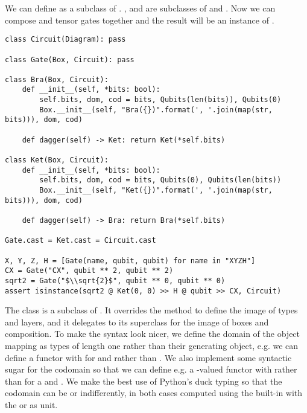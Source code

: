 \begin{example}\label{example:circuit-diagrams}
We can define  as a subclass of . ,  and  are subclasses of  and .
Now we can compose and tensor gates together and the result will be an instance of .

\begin{verbatim}
class Circuit(Diagram): pass

class Gate(Box, Circuit): pass

class Bra(Box, Circuit):
    def __init__(self, *bits: bool):
        self.bits, dom, cod = bits, Qubits(len(bits)), Qubits(0)
        Box.__init__(self, "Bra({})".format(', '.join(map(str, bits))), dom, cod)

    def dagger(self) -> Ket: return Ket(*self.bits)

class Ket(Box, Circuit):
    def __init__(self, *bits: bool):
        self.bits, dom, cod = bits, Qubits(0), Qubits(len(bits))
        Box.__init__(self, "Ket({})".format(', '.join(map(str, bits))), dom, cod)

    def dagger(self) -> Bra: return Bra(*self.bits)

Gate.cast = Ket.cast = Circuit.cast

X, Y, Z, H = [Gate(name, qubit, qubit) for name in "XYZH"]
CX = Gate("CX", qubit ** 2, qubit ** 2)
sqrt2 = Gate("$\\sqrt{2}$", qubit ** 0, qubit ** 0)
assert isinstance(sqrt2 @ Ket(0, 0) >> H @ qubit >> CX, Circuit)
\end{verbatim}
\end{example}

The  class is a subclass of .
It overrides the  method to define the image of types and layers, and it delegates to its superclass for the image of boxes and composition.
To make the syntax look nicer, we define the domain of the object mapping as types of length one rather than their generating object, e.g. we can define a functor with  for  and  rather than .
We also implement some syntactic sugar for the codomain so that we can define e.g. a -valued functor with  rather than  for a  and .
We make the best use of Python's duck typing so that the codomain can be  or  indifferently, in both cases computed using the built-in  with the  or \py{[]} as unit.

